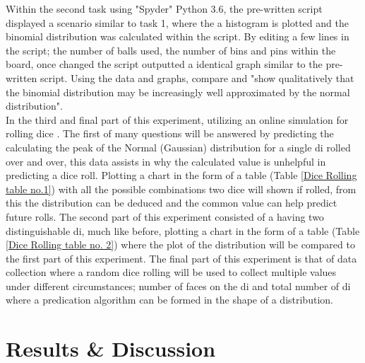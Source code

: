\documentclass[11pt]{article}
\begin{document}
Within the second task using "Spyder" Python 3.6, the pre-written script displayed a scenario similar to task 1, where the a histogram is plotted and the binomial distribution was calculated within the script. By editing a few lines in the script; the number of balls used, the number of bins and pins within the board, once changed the script outputted a identical graph similar to the pre-written script. Using the data and graphs, compare and "show qualitatively that the binomial distribution may be increasingly well approximated by the normal distribution"\cite{LLR.4-2018}. \\

In the third and final part of this experiment, utilizing an online simulation for rolling dice \cite{Dice-Roll}. The first of many questions will be answered by predicting the calculating the peak of the Normal (Gaussian) distribution for a single di rolled over and over, this data assists in why the calculated value is unhelpful in predicting a dice roll. Plotting a chart in the form of a table (Table \ref{Dice Rolling table no.1}) with all the possible combinations two dice will shown if rolled, from this the distribution can be deduced and the common value can help predict future rolls. The second part of this experiment consisted of a having two distinguishable di, much like before, plotting a chart in the form of a table (Table \ref{Dice Rolling table no. 2}) where the plot of the distribution will be compared to the first part of this experiment. The final part of this experiment is that of data collection where a random dice rolling \cite{Dice-Roll} will be used to collect multiple values under different circumstances; number of faces on the di and total number of di where a predication algorithm can be formed in the shape of a distribution.


\section{Results \& Discussion}
\label{Results Discussion Section}

\end{document}
